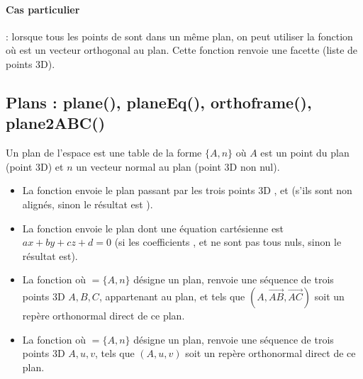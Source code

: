 \paragraph{Cas particulier}: lorsque tous les points de  sont dans un même plan, on peut utiliser la fonction  où  est un vecteur orthogonal au plan. Cette fonction renvoie une facette (liste de points 3D).

\subsection{Plans : plane(), planeEq(), orthoframe(), plane2ABC()}

Un plan de l'espace est une table de la forme $\{A,n\}$ où $A$ est un point du plan (point 3D) et $n$ un vecteur normal au plan (point 3D non nul).
\begin{itemize}
    \item La fonction  envoie le plan passant par les trois points 3D ,  et  (s'ils sont non alignés, sinon le résultat est \nil).
    
    \item La fonction  envoie le plan dont une équation cartésienne est $ax+by+cz+d=0$ (si les coefficients ,  et  ne sont pas tous nuls, sinon le résultat est\nil).
    
    \item La fonction  où $=\{A,n\}$ désigne un plan, renvoie une séquence de trois points 3D $A,B,C$, appartenant au plan, et tels que $(A,\vec{AB},\vec{AC})$ soit un repère orthonormal direct de ce plan.
    
    \item La fonction  où $=\{A,n\}$ désigne un plan, renvoie une séquence de trois points 3D $A,u,v$, tels que $(A,u,v)$ soit un repère orthonormal direct de ce plan.
\end{itemize}


